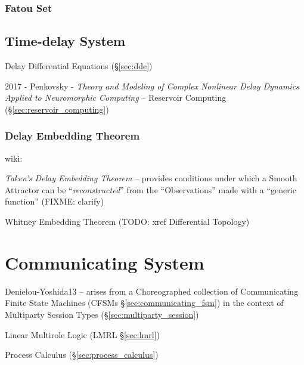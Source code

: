 \subsubsection{Fatou Set}\label{sec:fatou_set}



\subsection{Time-delay System}\label{sec:time_delay_system}

Delay Differential Equations (\S\ref{sec:dde})

2017 - Penkovsky - \emph{Theory and Modeling of Complex Nonlinear Delay Dynamics
  Applied to Neuromorphic Computing} -- Reservoir Computing
(\S\ref{sec:reservoir_computing})



\subsubsection{Delay Embedding Theorem}\label{sec:delay_embedding}

wiki:

\emph{Taken's Delay Embedding Theorem} -- provides conditions under which a
Smooth Attractor can be ``\emph{reconstructed}'' from the ``Observations'' made
with a ``generic function'' (FIXME: clarify)

Whitney Embedding Theorem (TODO: xref Differential Topology)



\section{Communicating System}\label{sec:communicating_system}

Denielou-Yoshida13 -- arises from a Choreographed collection of
Communicating Finite State Machines (CFSMs
\S\ref{sec:communicating_fsm}) in the context of Multiparty Session
Types (\S\ref{sec:multiparty_session})

Linear Multirole Logic (LMRL \S\ref{sec:lmrl})

\fist Process Calculus (\S\ref{sec:process_calculus})

